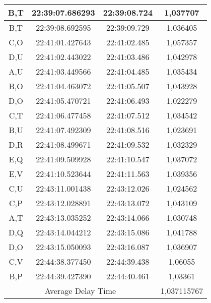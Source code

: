 \begin{table}[!ht]
\begin{tabular}{|ccc|c|}
  \multicolumn{1}{|c|}{B,T}  & \multicolumn{1}{c|}{22:39:07.686293} & 22:39:08.724       & 1,037707    \\ \hline
  \multicolumn{1}{|c|}{B,T}  & \multicolumn{1}{c|}{22:39:08.692595} & 22:39:09.729       & 1,036405    \\ \hline
  \multicolumn{1}{|c|}{C,O}  & \multicolumn{1}{c|}{22:41:01.427643} & 22:41:02.485       & 1,057357    \\ \hline
  \multicolumn{1}{|c|}{D,U}  & \multicolumn{1}{c|}{22:41:02.443022} & 22:41:03.486       & 1,042978    \\ \hline
  \multicolumn{1}{|c|}{A,U}  & \multicolumn{1}{c|}{22:41:03.449566} & 22:41:04.485       & 1,035434    \\ \hline
  \multicolumn{1}{|c|}{B,O}  & \multicolumn{1}{c|}{22:41:04.463072} & 22:41:05.507       & 1,043928    \\ \hline
  \multicolumn{1}{|c|}{D,O}  & \multicolumn{1}{c|}{22:41:05.470721} & 22:41:06.493       & 1,022279    \\ \hline
  \multicolumn{1}{|c|}{C,T}  & \multicolumn{1}{c|}{22:41:06.477458} & 22:41:07.512       & 1,034542    \\ \hline
  \multicolumn{1}{|c|}{B,U}  & \multicolumn{1}{c|}{22:41:07.492309} & 22:41:08.516       & 1,023691    \\ \hline
  \multicolumn{1}{|c|}{D,R}  & \multicolumn{1}{c|}{22:41:08.499671} & 22:41:09.532       & 1,032329    \\ \hline
  \multicolumn{1}{|c|}{E,Q}  & \multicolumn{1}{c|}{22:41:09.509928} & 22:41:10.547       & 1,037072    \\ \hline
  \multicolumn{1}{|c|}{E,V}  & \multicolumn{1}{c|}{22:41:10.523644} & 22:41:11.563       & 1,039356    \\ \hline
  \multicolumn{1}{|c|}{C,U}  & \multicolumn{1}{c|}{22:43:11.001438} & 22:43:12.026       & 1,024562    \\ \hline
  \multicolumn{1}{|c|}{C,P}  & \multicolumn{1}{c|}{22:43:12.028891} & 22:43:13.072       & 1,043109    \\ \hline
  \multicolumn{1}{|c|}{A,T}  & \multicolumn{1}{c|}{22:43:13.035252} & 22:43:14.066       & 1,030748    \\ \hline
  \multicolumn{1}{|c|}{D,Q}  & \multicolumn{1}{c|}{22:43:14.044212} & 22:43:15.086       & 1,041788    \\ \hline
  \multicolumn{1}{|c|}{D,O}  & \multicolumn{1}{c|}{22:43:15.050093} & 22:43:16.087       & 1,036907    \\ \hline
  \multicolumn{1}{|c|}{C,V}  & \multicolumn{1}{c|}{22:44:38.377450} & 22:44:39.438       & 1,06055     \\ \hline
  \multicolumn{1}{|c|}{B,P}  & \multicolumn{1}{c|}{22:44:39.427390} & 22:44:40.461       & 1,03361     \\ \hline
  \multicolumn{3}{|c|}{Average Delay Time}                                               & 1,037115767 \\ \hline
  \end{tabular}
\end{table}

